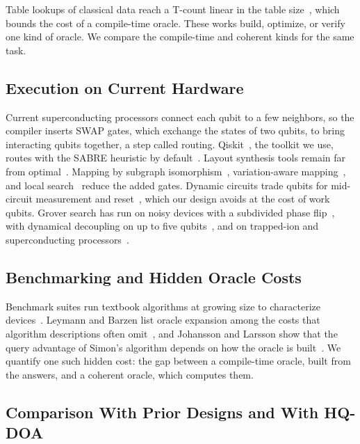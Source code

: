 \documentclass[journal]{IEEEtran}
\begin{document}
Table lookups of classical data reach a T-count linear in the table
size~\cite{babbush2018encoding}, which bounds the cost of a compile-time oracle.
These works build, optimize, or verify one kind of oracle. We compare the
compile-time and coherent kinds for the same task.

\subsection{Execution on Current Hardware}

Current superconducting processors connect each qubit to a few neighbors, so
the compiler inserts SWAP gates, which exchange the states of two qubits, to
bring interacting qubits together, a step called routing.
Qiskit~\cite{javadiabhari2024quantum}, the toolkit we use, routes with the SABRE
heuristic by default~\cite{li2019tackling}. Layout synthesis tools remain far
from optimal~\cite{tan2021optimality}. Mapping by subgraph
isomorphism~\cite{li2021qubit}, variation-aware mapping~\cite{zhu2023variation},
and local search~\cite{luo2025towards} reduce the added gates. Dynamic circuits
trade qubits for mid-circuit measurement and reset~\cite{fang2026dynamic}, which
our design avoids at the cost of work qubits. Grover search has run on noisy
devices with a subdivided phase flip~\cite{satoh2020subdivided}, with dynamical
decoupling on up to five qubits~\cite{pokharel2024better}, and on trapped-ion and
superconducting processors~\cite{figgatt2017complete,abughanem2025characterizing}.

\subsection{Benchmarking and Hidden Oracle Costs}

Benchmark suites run textbook algorithms at growing size to characterize
devices~\cite{lubinski2023application}. Leymann and Barzen list oracle expansion among the costs that algorithm
descriptions often omit~\cite{leymann2020bitter}, and Johansson and Larsson show
that the query advantage of Simon's algorithm depends on how the oracle is
built~\cite{johansson2019quantum}. We quantify one such hidden cost: the gap
between a compile-time oracle, built from the answers, and a coherent oracle,
which computes them.

\subsection{Comparison With Prior Designs and With HQ-DOA}
\label{sec:prior}
\end{document}
